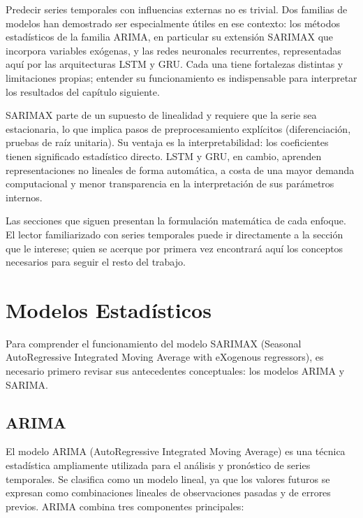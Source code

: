 \justify
Predecir series temporales con influencias externas no es trivial. Dos familias de modelos han demostrado ser especialmente útiles en ese contexto: los métodos estadísticos de la familia ARIMA, en particular su extensión SARIMAX que incorpora variables exógenas, y las redes neuronales recurrentes, representadas aquí por las arquitecturas LSTM y GRU. Cada una tiene fortalezas distintas y limitaciones propias; entender su funcionamiento es indispensable para interpretar los resultados del capítulo siguiente.

\justify
SARIMAX parte de un supuesto de linealidad y requiere que la serie sea estacionaria, lo que implica pasos de preprocesamiento explícitos (diferenciación, pruebas de raíz unitaria). Su ventaja es la interpretabilidad: los coeficientes tienen significado estadístico directo. LSTM y GRU, en cambio, aprenden representaciones no lineales de forma automática, a costa de una mayor demanda computacional y menor transparencia en la interpretación de sus parámetros internos.

\justify
Las secciones que siguen presentan la formulación matemática de cada enfoque. El lector familiarizado con series temporales puede ir directamente a la sección que le interese; quien se acerque por primera vez encontrará aquí los conceptos necesarios para seguir el resto del trabajo.

\section{Modelos Estadísticos}
\justify
Para comprender el funcionamiento del modelo SARIMAX (Seasonal AutoRegressive Integrated Moving Average with eXogenous regressors), es necesario primero revisar sus antecedentes conceptuales: los modelos ARIMA y SARIMA.

\subsection{ARIMA}
\justify
El modelo ARIMA (AutoRegressive Integrated Moving Average) es una técnica estadística ampliamente utilizada para el análisis y pronóstico de series temporales. Se clasifica como un modelo lineal, ya que los valores futuros se expresan como combinaciones lineales de observaciones pasadas y de errores previos. \cite{newbold1983arima,lee2011short}
\justify
ARIMA combina tres componentes principales:
 
